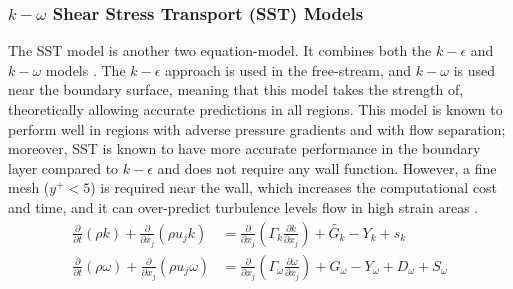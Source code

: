 \subsubsection{$k-\omega$ Shear Stress Transport (SST) Models}
The SST model is another two equation-model. It combines both the $k-\epsilon$ and $k-\omega$ models \cite{Andersson2011Turbulent-flowModelling}\cite{Ansys2006ModelingFlows}.  The $k-\epsilon$ approach is used in the free-stream, and $k-\omega$ is used near the boundary surface, meaning that this model takes the strength of, theoretically allowing accurate predictions in all regions. This model is known to perform well in regions with adverse pressure gradients and with flow separation; moreover, SST is known to have more accurate performance in the boundary layer compared to $k-\epsilon$ and does not require any wall function\cite{Andersson2011Turbulent-flowModelling}. However, a fine mesh ($y^+  < 5$) is required near the wall, which increases the computational cost and time, and it can over-predict turbulence levels flow in high strain areas \cite{Andersson2011Turbulent-flowModelling}\cite{Ansys2006ModelingFlows}. \begin{align}
\frac{\partial }{\partial t}({\rho} k)+\frac{\partial}{\partial x_j}({\rho} {u}_j k) & = \frac{\partial}{\partial x_j} (\Gamma_{k} \frac{\partial k}{\partial x_j}) + \tilde{G_k} - Y_k +s_k \\
\frac{\partial}{\partial t}(\rho \omega)+\frac{\partial}{\partial x_j}({\rho} {u}_j \omega) & = \frac{\partial}{\partial x_j}(\Gamma_\omega \frac{\partial \omega}{\partial x_j}) + G_\omega - Y_\omega + D_\omega + S_\omega
\end{align} 

